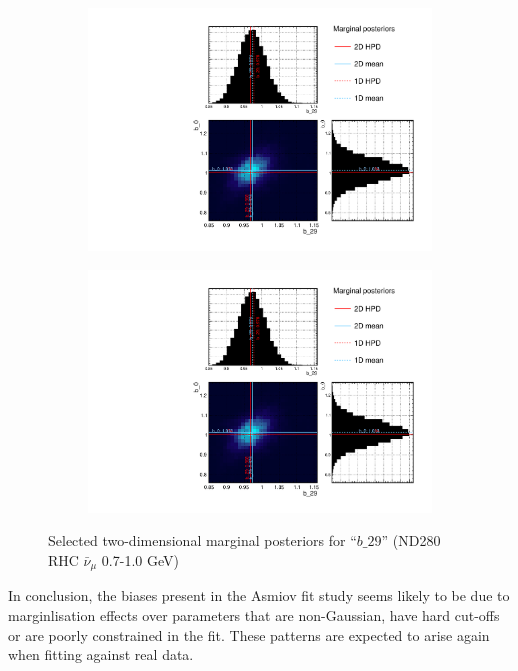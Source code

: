 \begin{figure}[h]
\begin{subfigure}[t]{0.24\textwidth}
		\includegraphics[width=\textwidth, trim={0mm 0mm 0mm 0mm}, clip,page=50]{figures/mach3/mcmc/2017b_NewDet_3Xsec_4Det_5Flux_NewXSecTune_Asimov_merge_b29}
	\end{subfigure}
	\begin{subfigure}[t]{0.24\textwidth}
		\includegraphics[width=\textwidth, trim={0mm 0mm 0mm 0mm}, clip,page=61]{figures/mach3/mcmc/2017b_NewDet_3Xsec_4Det_5Flux_NewXSecTune_Asimov_merge_b29}
	\end{subfigure}
	\caption{Selected two-dimensional marginal posteriors for ``$b\_29$'' (ND280 RHC $\bar{\nu}_\mu$ 0.7-1.0 GeV)}
	\label{fig:marginalisation_b29}
\end{figure}
In conclusion, the biases present in the Asmiov fit study seems likely to be due to marginlisation effects over parameters that are non-Gaussian, have hard cut-offs or are poorly constrained in the fit. These patterns are expected to arise again when fitting against real data.

